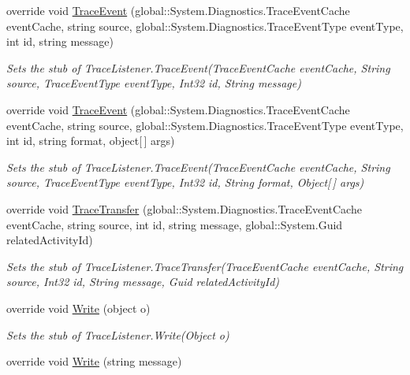 \begin{DoxyCompactItemize}
override void \hyperlink{class_system_1_1_diagnostics_1_1_fakes_1_1_stub_default_trace_listener_a8e63d5de6c1ba02549955195c7e57f73}{Trace\-Event} (global\-::\-System.\-Diagnostics.\-Trace\-Event\-Cache event\-Cache, string source, global\-::\-System.\-Diagnostics.\-Trace\-Event\-Type event\-Type, int id, string message)
\begin{DoxyCompactList}\small\item\em Sets the stub of Trace\-Listener.\-Trace\-Event(\-Trace\-Event\-Cache event\-Cache, String source, Trace\-Event\-Type event\-Type, Int32 id, String message)\end{DoxyCompactList}\item 
override void \hyperlink{class_system_1_1_diagnostics_1_1_fakes_1_1_stub_default_trace_listener_a70ccc7d13ad04dc20f3d3be0b04a6f7f}{Trace\-Event} (global\-::\-System.\-Diagnostics.\-Trace\-Event\-Cache event\-Cache, string source, global\-::\-System.\-Diagnostics.\-Trace\-Event\-Type event\-Type, int id, string format, object\mbox{[}$\,$\mbox{]} args)
\begin{DoxyCompactList}\small\item\em Sets the stub of Trace\-Listener.\-Trace\-Event(\-Trace\-Event\-Cache event\-Cache, String source, Trace\-Event\-Type event\-Type, Int32 id, String format, Object\mbox{[}$\,$\mbox{]} args)\end{DoxyCompactList}\item 
override void \hyperlink{class_system_1_1_diagnostics_1_1_fakes_1_1_stub_default_trace_listener_a8c1b2b074d49750f80c0aba2a6f46f99}{Trace\-Transfer} (global\-::\-System.\-Diagnostics.\-Trace\-Event\-Cache event\-Cache, string source, int id, string message, global\-::\-System.\-Guid related\-Activity\-Id)
\begin{DoxyCompactList}\small\item\em Sets the stub of Trace\-Listener.\-Trace\-Transfer(\-Trace\-Event\-Cache event\-Cache, String source, Int32 id, String message, Guid related\-Activity\-Id)\end{DoxyCompactList}\item 
override void \hyperlink{class_system_1_1_diagnostics_1_1_fakes_1_1_stub_default_trace_listener_a2538e6077a11e060d97483738c8629f7}{Write} (object o)
\begin{DoxyCompactList}\small\item\em Sets the stub of Trace\-Listener.\-Write(\-Object o)\end{DoxyCompactList}\item 
override void \hyperlink{class_system_1_1_diagnostics_1_1_fakes_1_1_stub_default_trace_listener_ad5c523587d0283ae3ab01ccfd3c7944c}{Write} (string message)

\end{DoxyCompactItemize}
